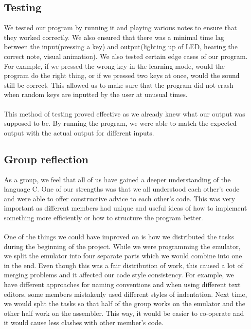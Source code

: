 \documentclass[11pt]{article}
\begin{document}
\subsection{Testing} 
We tested our program by running it and playing various notes to ensure that they worked correctly. We also ensured that there was a minimal time lag between the input(pressing a key) and output(lighting up of LED, hearing the correct note, visual animation). We also tested certain edge cases of our program. For example, if we pressed the wrong key in the learning mode, would the program do the right thing, or if we pressed two keys at once, would the sound still be correct. This allowed us to make sure that the program did not crash when random keys are inputted by the user at unusual times.
\\
\\
This method of testing proved effective as we already knew what our output was supposed to be. By running the program, we were able to match the expected output with the actual output for different inputs.
\subsection{Group reflection} 
As a group, we feel that all of us have gained a deeper understanding of the language C. One of our strengths was that we all understood each other's code and were able to offer constructive advice to each other's code. This was very important as different members had unique and useful ideas of how to implement something more efficiently or how to structure the program better.
\\
\\
One of the things we could have improved on is how we distributed the tasks during the beginning of the project. While we were programming the emulator, we split the emulator into four separate parts which we would combine into one in the end. Even though this was a fair distribution of work, this caused a lot of merging problems and it affected our code style consistency. For example, we have different approaches for naming conventions and when using different text editors, some members mistakenly used different styles of indentation. Next time, we would split the tasks so that half of the group works on the emulator and the other half work on the assembler. This way, it would be easier to co-operate and it would cause less clashes with other member's code.
\end{document}
